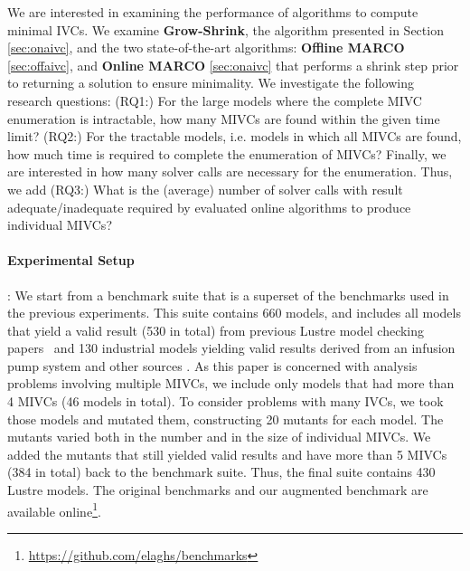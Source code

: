 We are interested in examining the performance of algorithms to compute minimal IVCs.
We examine \textbf{Grow-Shrink}, the algorithm presented in Section \ref{sec:onaivc}, and the two state-of-the-art algorithms: \textbf{Offline MARCO} \ref{sec:offaivc}, and \textbf{Online MARCO} \ref{sec:onaivc} that performs a shrink step prior to returning a solution to ensure minimality.
We investigate the following research questions: (RQ1:) For the large models where the complete MIVC enumeration is intractable,
how many MIVCs are found within the given time limit?  (RQ2:) For the tractable models, i.e. models in which all MIVCs are found, how much time is required to complete the enumeration of MIVCs?  Finally, we are interested in how many solver calls are necessary for the enumeration.  Thus, we add (RQ3:) What is the (average) number of solver calls with result adequate/inadequate required by evaluated online algorithms to produce individual MIVCs?

\paragraph{Experimental Setup}:  We start from a benchmark suite that is a superset of the benchmarks used in the previous experiments. This suite contains 660 models, and includes all models that yield a valid result (530 in total) from previous Lustre model checking papers~\cite{Hagen08:FMCAD,piskac2016} and 130 industrial models yielding valid results derived from an infusion pump system \cite{hilt2013} and other sources \cite{piskac2016,NFM2015:backes}.
As this paper is concerned with analysis problems involving multiple MIVCs, we include only models that had more than 4 MIVCs (46 models in total).  To consider problems with many IVCs, we took those models and mutated them, constructing 20 mutants for each model. The mutants varied both in the number and in the size of individual MIVCs.
We added the mutants that still yielded valid results and have more than 5 MIVCs (384 in total) back to the benchmark suite.
Thus, the final suite contains 430 Lustre models. The original benchmarks and our augmented benchmark are available online\footnote{\url{https://github.com/elaghs/benchmarks}}.

